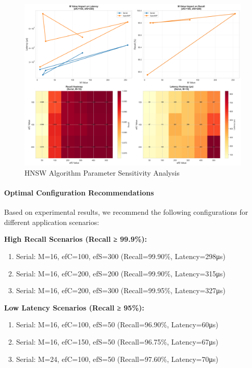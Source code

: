 \begin{figure}[htbp]
\centering
\includegraphics[width=\textwidth]{plots/hnsw_parameter_sensitivity_en.png}
\caption{HNSW Algorithm Parameter Sensitivity Analysis}
\label{fig:hnsw_parameter_sensitivity_en}
\end{figure}

\paragraph{Optimal Configuration Recommendations}

Based on experimental results, we recommend the following configurations for different application scenarios:

\textbf{High Recall Scenarios (Recall ≥ 99.9\%):}
\begin{enumerate}
    \item Serial: M=16, efC=100, efS=300 (Recall=99.90\%, Latency=298μs)
    \item Serial: M=16, efC=200, efS=200 (Recall=99.90\%, Latency=315μs)
    \item Serial: M=16, efC=200, efS=300 (Recall=99.95\%, Latency=327μs)
\end{enumerate}

\textbf{Low Latency Scenarios (Recall ≥ 95\%):}
\begin{enumerate}
    \item Serial: M=16, efC=100, efS=50 (Recall=96.90\%, Latency=60μs)
    \item Serial: M=16, efC=150, efS=50 (Recall=96.75\%, Latency=67μs)
    \item Serial: M=24, efC=100, efS=50 (Recall=97.60\%, Latency=70μs)
\end{enumerate}


